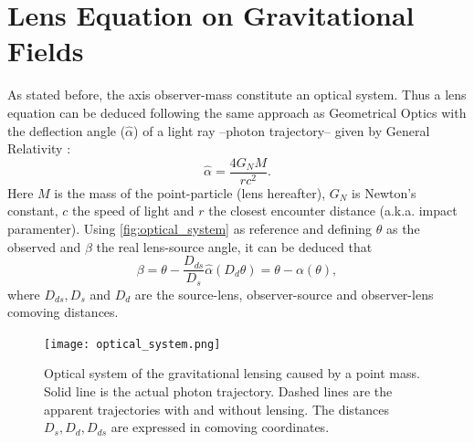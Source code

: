 \section{Lens Equation on Gravitational Fields}
As stated before, the axis observer-mass constitute an optical system. Thus a lens equation can be deduced following the same approach as Geometrical Optics with the deflection angle ($\hat\alpha$) of a light ray --photon trajectory-- given by General Relativity \cite{Weinberg,2001PhR...340..291B,2006glsw.conf.....M,2008ARNPS..58...99H,2041-8205-723-1-L13,Weinberg201387,2015RPPh...78h6901K}:
\begin{equation}
\hat\alpha = \frac{4G_NM}{rc^2}.
\label{eq:deflection_angle}
\end{equation}
Here $M$ is the mass of the point-particle (lens hereafter), $G_N$ is Newton's constant, $c$ the speed of light and $r$ the closest encounter distance (a.k.a. impact paramenter). Using \autoref{fig:optical_system} as reference and defining $\theta$ as the observed and $\beta$ the real lens-source angle, it can be deduced that
\begin{equation}
\beta = \theta - \frac{D_{ds}}{D_s}\hat\alpha(D_d\theta)=\theta-\alpha(\theta),
\label{eq:lens_equation}
\end{equation}
where $D_{ds},D_s$ and $D_d$ are the source-lens, observer-source and observer-lens comoving distances.
\begin{figure}
\texttt{[image: optical\_system.png]}
\caption{Optical system of the gravitational lensing caused by a point mass. Solid line is the actual photon trajectory. Dashed lines are the apparent trajectories with and without lensing. The distances $D_s,D_d,D_{ds}$ are expressed in comoving coordinates. }
\label{fig:optical_system}
\end{figure}
\newline

